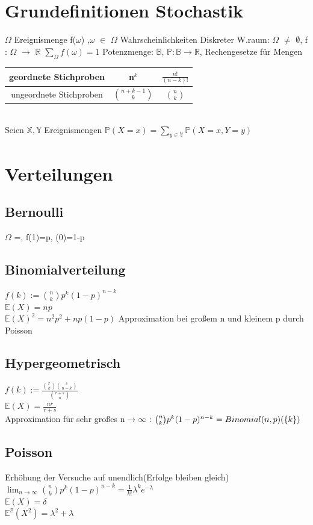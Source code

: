 \documentclass[]{article}
\begin{document}
\section{Grundefinitionen Stochastik}
$\Omega$ Ereignismenge
f($\omega$) ,$\omega$ $\in$ $\Omega$ Wahrscheinlichkeiten
Diskreter W.raum: 
$\Omega$ $\neq$ $\emptyset$, f : $\Omega$ $\rightarrow$ $\mathbb{R}$ $\sum_\Omega f(\omega) = 1$
Potenzmenge: $\mathbb{B}$, $\mathbb{P}: \mathbb{B} \rightarrow \mathbb{R}$,
Rechengesetze für Mengen

\begin{tabular}{|c|c|c|}
	\hline 
	geordnete Stichproben & n$^k$ & $\frac{n!}{(n-k)!}$ \\ 
	\hline 
	ungeordnete Stichproben  & $\binom{n+k-1}{k}$ & $\binom{n}{k}$ \\ 
	\hline 
\end{tabular}\\
    Seien $\mathbb{X}, \mathbb{Y}$ Ereignismengen
	$\mathbb{P}(X = x) = \sum_{y \in \mathbb{Y}} \mathbb{P}(X = x, Y = y)$
\section{Verteilungen}
\subsection{Bernoulli}
$\Omega$ =, f(1)=p, (0)=1-p
\subsection{Binomialverteilung}
$f(k):=\binom{n}{k}p^k(1-p)^{n-k}$\\
$\mathbb{E}(X)=n p$\\
$\mathbb{E}(X)^2=n^2 p^2+np(1-p)$
Approximation bei großem n und kleinem p durch Poisson 
\subsection{Hypergeometrisch}
$f(k):= \frac{\binom{r}{k}\binom{s}{n-k}}{\binom{r+s}{n}}$\\
$\mathbb{E}(X)=\frac{nr}{r+s}$\\
Approximation für sehr großes n$\rightarrow\infty$	: $\binom{n}{k}p^k(1-p)^{n-k}=Binomial(n,p)(\set{k})$
\subsection{Poisson}
Erhöhung der Versuche auf unendlich(Erfolge bleiben gleich)
$\lim_{n \rightarrow \infty} \binom{n}{k}p^k(1-p)^{n-k} = \frac{1}{k!}\lambda^k e^{-\lambda} $\\
$\mathbb{E}(X)=\delta$\\
$\mathbb{E^2}(X^2)=\lambda^2+ \lambda$
\end{document}
